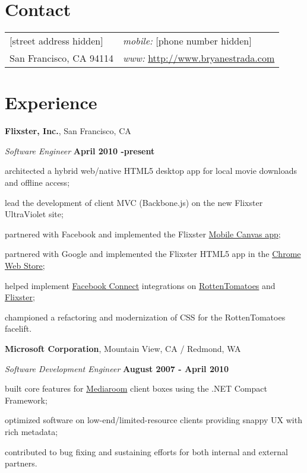 \documentclass[margin,line]{res}
\newenvironment{list1}{
  \begin{list}{\ding{113}}{%
      \setlength{\itemsep}{0in}
      \setlength{\parsep}{0in} \setlength{\parskip}{0in}
      \setlength{\topsep}{0in} \setlength{\partopsep}{0in} 
      \setlength{\leftmargin}{0.17in}}}{\end{list}}
\begin{document}

\begin{resume}
\section{\sc \large Contact}
\vspace{.05in}
\begin{tabular}{@{}p{2in}p{4in}}
[street address hidden]    & {\it mobile:} [phone number hidden] \\            
San Francisco, CA 94114    & {\it www:} \url{http://www.bryanestrada.com} \\         
\end{tabular}


\section{\sc \large Experience}
{\bf Flixster, Inc.}, San Francisco, CA

\vspace{-.3cm}
{\em Software Engineer} \hfill {\small \bf April 2010 -present}
\begin{list1}
\item[] architected a hybrid web/native HTML5 desktop app for local movie downloads and offline access;
\item[] lead the development of client MVC (Backbone.js) on the new Flixster UltraViolet site;
\item[] partnered with Facebook and implemented the Flixster \href{http://www.facebookmobileweb.com/showcase/}{Mobile Canvas app};
\item[] partnered with Google and implemented the Flixster HTML5 app in the \href{https://chrome.google.com/webstore/detail/hgbpjlnkjhllfgfdmieompodgaefjcfh}{Chrome Web Store};
\item[] helped implement \href{http://www.facebook.com/instantpersonalization/}{Facebook Connect} integrations on \href{http://www.rottentomatoes.com/}{RottenTomatoes} and \href{http://www.flixster.com/}{Flixster};
\item[] championed a refactoring and modernization of CSS for the RottenTomatoes facelift.
\end{list1}

{\bf Microsoft Corporation}, Mountain View, CA / Redmond, WA

\vspace{-.3cm}
{\em Software Development Engineer} \hfill {\small \bf August 2007 - April 2010}
\begin{list1}
\item[] built core features for \href{http://www.microsoftmediaroom.com/}{Mediaroom} client boxes using the .NET Compact Framework;
\item[] optimized software on low-end/limited-resource clients providing snappy UX with rich metadata;
\item[] contributed to bug fixing and sustaining efforts for both internal and external partners.
\end{list1}


\end{resume}
\end{document}
